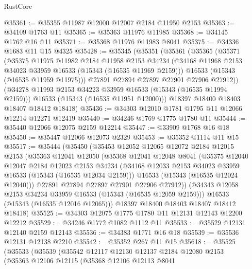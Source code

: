 \begin{lexlean}{RustCore}
\begin{coremodule}
@35361 := @35355 @11987 @12000 @12007 @2184 @11950 @2153
@35363 := @34109 @1763 @11
@35365 := @35363 @11976 @11985
@35368 := @34145 @1762 @16 @11
@35371 := @35368 @11976 @11983 @8041
@35375 := @34336 @1683 @11 @15 @4325
@35428 := @35345
    (@35351
      (@35361
        (@35365
          (@35371
            (@35375
              @11975
              @11982
              @2184
              @11958
              @2153
              @34234
              (@34168 @11968 @2153 @34023 @33959 @16533 (@15343 (@16535 @11969 @2159)))
              @16533
              (@15343 (@16535 @11959 @11975)))
            @27891
            @27894
            @27897
            @27901
            @27906
            @27912))
        (@34278 @11993 @2153 @34223 @33959 @16533 (@15343 (@16535 @11994 @2159)))
        @16533
        (@15343 (@16535 @11951 @12000)))
      @18397
      @18400
      @18403
      @18407
      @18412
      @18418)
@35436 := @34303 @12010 @1781 @1795 @11 @12066 @12214 @12271 @12419
@35440 := @34246 @1769 @1775 @1780 @11
@35444 := @35440 @12066 @12075 @2159 @12214
@35447 := @33909 @1768 @16 @18
@35450 := @35447 @12066 @12073 @2329
@35453 := @35352 @1114 @11 @15
@35517 := @35444
    (@35450
      (@35453
        @12052
        @12065
        @12072
        @2184
        @12015
        @2153
        (@35363
          @12041
          @12050
          (@35368
            @12041
            @12048
            @8041
            (@35375
              @12040
              @12047
              @2184
              @12023
              @2153
              @34234
              (@34168 @12033 @2153 @34023 @33959 @16533 (@15343 (@16535 @12034 @2159)))
              @16533
              (@15343 (@16535 @12024 @12040)))
            @27891
            @27894
            @27897
            @27901
            @27906
            @27912))
        (@34343 @12058 @2153 @34234 @33959 @16533 (@15343 (@16535 @12059 @2159)))
        @16533
        (@15343 (@16535 @12016 @12065)))
      @18397
      @18400
      @18403
      @18407
      @18412
      @18418)
@35525 := @34303 @12075 @1775 @1780 @11 @12131 @12143 @12200 @12212
@35529 := @34246 @1772 @1082 @1112 @11
@35533 := @35529 @12131 @12140 @2159 @12143
@35536 := @34383 @1771 @16 @18
@35539 := @35536 @12131 @12138 @2210
@35542 := @35352 @267 @11 @15
@35618 := @35525
    (@35533
      (@35539
        (@35542
          @12117
          @12130
          @12137
          @2184
          @12080
          @2153
          (@35363
            @12106
            @12115
            (@35368
              @12106
              @12113
              @8041

\end{coremodule}
\end{lexlean}
